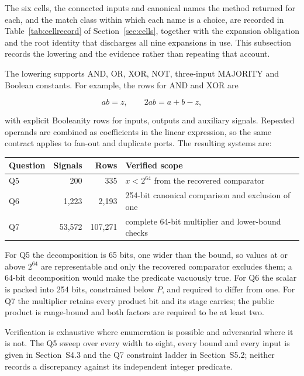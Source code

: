 \documentclass[11pt,a4paper]{article}
\begin{document}
The six cells, the connected inputs and canonical names the method returned for
each, and the match class within which each name is a choice, are recorded in
Table~\ref{tab:cellrecord} of Section~\ref{sec:cells}, together with the
expansion obligation and the root identity that discharges all nine expansions
in use. This subsection records the lowering and the evidence rather than
repeating that account.

The lowering supports AND, OR, XOR, NOT, three-input MAJORITY and Boolean
constants. For example, the rows for AND and XOR are

\begin{equation}
 ab=z,\qquad 2ab=a+b-z,
\end{equation}

with explicit Booleanity rows for inputs, outputs and auxiliary signals.
Repeated operands are combined as coefficients in the linear expression, so
the same contract applies to fan-out and duplicate ports. The resulting
systems are:

\begin{center}
\begin{tabularx}{\linewidth}{lrrX}
\toprule
Question & Signals & Rows & Verified scope\\\midrule
Q5 & 200 & 335 & $x<2^{64}$ from the recovered comparator\\
Q6 & 1,223 & 2,193 & 254-bit canonical comparison and exclusion of one\\
Q7 & 53,572 & 107,271 & complete 64-bit multiplier and lower-bound checks\\
\bottomrule
\end{tabularx}
\end{center}

For Q5 the decomposition is 65 bits, one wider than the bound, so values at or
above $2^{64}$ are representable and only the recovered comparator excludes
them; a 64-bit decomposition would make the predicate vacuously true. For Q6
the scalar is packed into 254 bits, constrained below $P$, and required to
differ from one. For Q7 the multiplier retains every product bit and its stage
carries; the public product is range-bound and both factors are required to be
at least two.

Verification is exhaustive where enumeration is possible and adversarial where
it is not. The Q5 sweep over every width to eight, every bound and every input
is given in Section~S4.3 and the Q7 constraint ladder in Section~S5.2; neither
records a discrepancy against its independent integer predicate.
\end{document}
